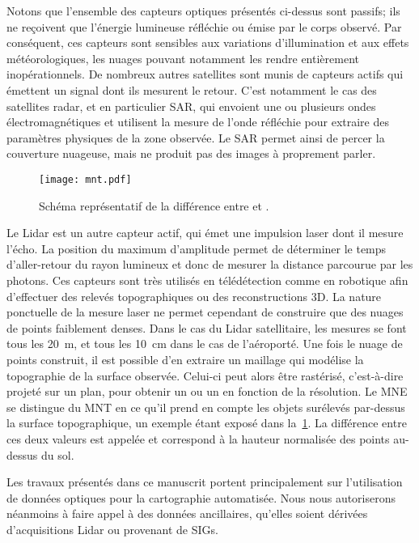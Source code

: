 Notons que l'ensemble des capteurs optiques présentés ci-dessus sont passifs; ils ne reçoivent que l'énergie lumineuse réfléchie ou émise par le corps observé. Par conséquent, ces capteurs sont sensibles aux variations d'illumination et aux effets météorologiques, les nuages pouvant notamment les rendre entièrement inopérationnels. De nombreux autres satellites sont munis de capteurs actifs qui émettent un signal dont ils mesurent le retour. C'est notamment le cas des satellites radar, et en particulier \gls{SAR}, qui envoient une ou plusieurs ondes électromagnétiques et utilisent la mesure de l'onde réfléchie pour extraire des paramètres physiques de la zone observée. Le \gls{SAR} permet ainsi de percer la couverture nuageuse, mais ne produit pas des images à proprement parler.

\begin{figure}
  \texttt{[image: mnt.pdf]}
  \caption{Schéma représentatif de la différence entre  et .}
  \label{fig:mnt}
\end{figure}

Le \gls{Lidar} est un autre capteur actif, qui émet une impulsion laser dont il mesure l'écho. La position du maximum d'amplitude permet de déterminer le temps d'aller-retour du rayon lumineux et donc de mesurer la distance parcourue par les photons. Ces capteurs sont très utilisés en télédétection comme en robotique afin d'effectuer des relevés topographiques ou des reconstructions 3D. La nature ponctuelle de la mesure laser ne permet cependant de construire que des nuages de points faiblement denses. Dans le cas du \gls{Lidar} satellitaire, les mesures se font tous les \SI{20}{\meter}, et tous les \SI{10}{\centi\meter} dans le cas de l'aéroporté. Une fois le nuage de points construit, il est possible d'en extraire un maillage qui modélise la topographie de la surface observée. Celui-ci peut alors être rastérisé, c'est-à-dire projeté sur un plan, pour obtenir un  ou un  en fonction de la résolution. Le \gls{MNE} se distingue du \gls{MNT} en ce qu'il prend en compte les objets surélevés par-dessus la surface topographique, un exemple étant exposé dans la~\cref{fig:mnt}. La différence entre ces deux valeurs est appelée  et correspond à la hauteur normalisée des points au-dessus du sol.

Les travaux présentés dans ce manuscrit portent principalement sur l'utilisation de données optiques pour la cartographie automatisée. Nous nous autoriserons néanmoins à faire appel à des données ancillaires, qu'elles soient dérivées d'acquisitions \gls{Lidar} ou provenant de \glspl{SIG}.

